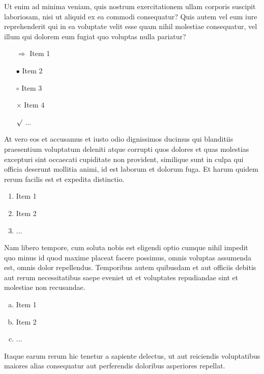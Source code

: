 Ut enim ad minima veniam, quis nostrum exercitationem ullam corporis suscipit laboriosam, nisi ut aliquid ex ea commodi consequatur? Quis autem vel eum iure reprehenderit qui in ea voluptate velit esse quam nihil molestiae consequatur, vel illum qui dolorem eum fugiat quo voluptas nulla pariatur?

\begin{itemize}
	\item[$\Rightarrow$] Item 1
	\item[$\bullet$] Item 2
	\item[$\circ$] Item 3
	\item[$\times$] Item 4
	\item[$\surd$] ...
\end{itemize}

At vero eos et accusamus et iusto odio dignissimos ducimus qui blanditiis praesentium voluptatum deleniti atque corrupti quos dolores et quas molestias excepturi sint occaecati cupiditate non provident, similique sunt in culpa qui officia deserunt mollitia animi, id est laborum et dolorum fuga. Et harum quidem rerum facilis est et expedita distinctio. 

\begin{enumerate}
	\item Item 1
	\item Item 2
	\item ...
\end{enumerate}

Nam libero tempore, cum soluta nobis est eligendi optio cumque nihil impedit quo minus id quod maxime placeat facere possimus, omnis voluptas assumenda est, omnis dolor repellendus. Temporibus autem quibusdam et aut officiis debitis aut rerum necessitatibus saepe eveniet ut et voluptates repudiandae sint et molestiae non recusandae. 

\begin{enumerate}[a)]
	\item Item 1
	\item Item 2
	\item ...
\end{enumerate}

Itaque earum rerum hic tenetur a sapiente delectus, ut aut reiciendis voluptatibus maiores alias consequatur aut perferendis doloribus asperiores repellat.

